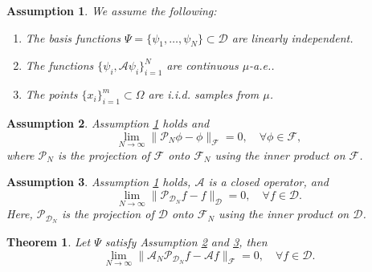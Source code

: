 \documentclass{article}[11]
\newtheorem{theorem}{Theorem}
\newtheorem{assumption}{Assumption}
\begin{document}
	\begin{assumption}\label{assumption_1}
		We assume the following:
		\begin{enumerate}
			\item The basis functions $\Psi = \{ \psi_1, \dots, \psi_N \} \subset \mathcal{D}$ are linearly independent.
			\item The functions $\{ \psi_i, \mathcal{A} \psi_i \}_{i=1}^N$ are continuous $\mu$-a.e..
			\item The points $\{ x_i \}_{i=1}^m \subset \Omega$ are i.i.d. samples from $\mu$.
		\end{enumerate}
	\end{assumption}
	
	\begin{assumption}\label{assumption_2}
		Assumption \ref{assumption_1} holds and
		\[
		\lim_{N \to \infty} \| \mathcal{P}_N \phi - \phi \|_{\mathcal{F}} = 0, \quad \forall \phi \in \mathcal{F},
		\]
		where $\mathcal{P}_N$ is the projection of $\mathcal{F}$ onto $\mathcal{F}_N$ using the inner product on $\mathcal{F}$.	
	\end{assumption}
	
	\begin{assumption}\label{assumption_3}
		Assumption \ref{assumption_1} holds, $\mathcal{A}$ is a closed operator, and
		\[
		\lim_{N \to \infty} \| \mathcal{P}_{\mathcal{D}_N} f - f \|_{\mathcal{D}} = 0, \quad \forall f \in \mathcal{D}.
		\]
		Here, $\mathcal{P}_{\mathcal{D}_N}$ is the projection of $\mathcal{D}$ onto $\mathcal{F}_N$ using the inner product on $\mathcal{D}$.
	\end{assumption}
	
	\begin{theorem}
		Let $\Psi$ satisfy Assumption \ref{assumption_2} and \ref{assumption_3}, then
		\[
		\lim_{N \to \infty} \| \mathcal{A}_N \mathcal{P}_{\mathcal{D}_N} f - \mathcal{A} f \|_{\mathcal{F}} = 0, \quad \forall f \in \mathcal{D}.
		\]
	\end{theorem}
	
\end{document}
